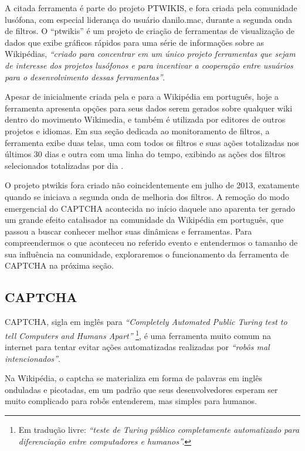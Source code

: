 
A citada ferramenta é parte do projeto PTWIKIS, e fora criada pela comunidade lusófona, com especial liderança do usuário danilo.mac, durante a segunda onda de filtros. O “ptwikis” é um projeto de criação de ferramentas de visualização de dados que exibe gráficos rápidos para uma série de informações sobre as Wikipédias, \textit{“criado para concentrar em um único projeto ferramentas que sejam de interesse dos projetos lusófonos e para incentivar a cooperação entre usuários para o desenvolvimento dessas ferramentas”}. 

Apesar de inicialmente criada pela e para a Wikipédia em português, hoje a ferramenta apresenta opções para seus dados serem gerados sobre qualquer wiki dentro do movimento Wikimedia, e também é utilizada por editores de outros projetos e idiomas. Em sua seção dedicada ao monitoramento de filtros, a ferramenta exibe duas telas, uma com todos os filtros e suas ações totalizadas nos últimos 30 dias  e  outra com uma linha do tempo, exibindo as ações dos filtros selecionados totalizadas por dia .

O projeto ptwikis fora criado não coincidentemente em julho de 2013, exatamente quando se iniciava a segunda onda de melhoria dos filtros. A remoção do modo emergencial do CAPTCHA acontecida no início daquele ano aparenta ter gerado um grande efeito catalisador na comunidade da Wikipédia em português, que passou a buscar conhecer melhor suas dinâmicas e ferramentas. Para compreendermos o que aconteceu no referido evento e entendermos o tamanho de sua influência na comunidade, exploraremos o funcionamento da ferramenta de CAPTCHA na próxima seção.

\subsection{CAPTCHA}

CAPTCHA, sigla em inglês para \textit{``Completely Automated Public Turing test to tell Computers and Humans Apart''} \footnote{Em tradução livre: \textit{“teste de Turing público completamente automatizado para diferenciação entre computadores e humanos”.}}, é uma ferramenta muito comum na internet para tentar evitar ações automatizadas realizadas por \textit{``robôs mal intencionados''}. 

Na Wikipédia, o captcha se materializa em forma de palavras em inglês onduladas e picotadas, em um padrão que seus desenvolvedores esperam ser muito complicado para robôs entenderem, mas simples para humanos. 

